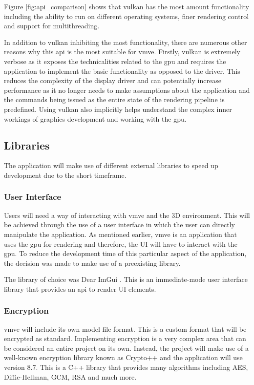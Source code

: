 \documentclass[11pt]{article}
\begin{document}
Figure \ref{fig:api_comparison} shows that \gls{vulkan} has the most amount
functionality including the ability to run on different operating systems, 
finer rendering control and support for multithreading.

In addition to \gls{vulkan} inhibiting the most functionality, there are
numerous other reasons why this \gls{api} is the most suitable for \gls{vmve}.
Firstly, \gls{vulkan} is extremely verbose as it exposes the technicalities
related to the \gls{gpu} and requires the application to implement the basic
functionality as opposed to the driver. This reduces the complexity of the
display driver and can potentially increase performance as it no longer needs to
make assumptions about the application and the commands being issued as the
entire state of the rendering pipeline is predefined. Using \gls{vulkan} also
implicitly helps understand the complex inner workings of graphics development
and working with the \gls{gpu}.

\subsection{Libraries}
The application will make use of different external libraries to speed up 
development due to the short timeframe.

\subsubsection{User Interface}
Users will need a way of interacting with \gls{vmve} and the 3D environment.
This will be achieved through the use of a user interface in which the user can
directly manipulate the application. As mentioned earlier, \gls{vmve} is an
application that uses the \gls{gpu} for rendering and therefore, the UI will
have to interact with the \gls{gpu}. To reduce the development time of this
particular aspect of the application, the decision was made to make use of a
preexisting library.

The library of choice was Dear ImGui \cite{imgui}. This is an immediate-mode
user interface library that provides an \gls{api} to render UI elements. 

\subsubsection{Encryption} \label{custom_file_format} \gls{vmve} will include
its own model file format. This is a custom format that will be encrypted as
standard. Implementing encryption is a very complex area that can be considered
an entire project on its own. Instead, the project will make use of a well-known
encryption library known as Crypto++ \cite{cryptopp} and the application will
use version 8.7. This is a C++ library that provides many algorithms including
AES, Diffie-Hellman, GCM, RSA and much more.
\end{document}
